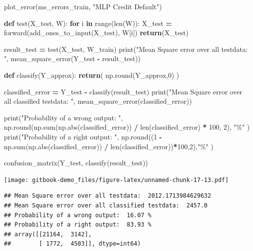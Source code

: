 \documentclass[
]{book}
\newenvironment{Shaded}{\begin{snugshade}}{\end{snugshade}}
\newcommand{\BuiltInTok}[1]{#1}
\newcommand{\ControlFlowTok}[1]{\textcolor[rgb]{0.13,0.29,0.53}{\textbf{#1}}}
\newcommand{\DecValTok}[1]{\textcolor[rgb]{0.00,0.00,0.81}{#1}}
\newcommand{\KeywordTok}[1]{\textcolor[rgb]{0.13,0.29,0.53}{\textbf{#1}}}
\newcommand{\NormalTok}[1]{#1}
\newcommand{\OperatorTok}[1]{\textcolor[rgb]{0.81,0.36,0.00}{\textbf{#1}}}
\newcommand{\StringTok}[1]{\textcolor[rgb]{0.31,0.60,0.02}{#1}}
\begin{document}
\begin{Shaded}
\begin{Highlighting}[]
\NormalTok{plot\_error(ms\_errors\_train, }\StringTok{"MLP Credit Default"}\NormalTok{)}



\KeywordTok{def}\NormalTok{ test(X\_test, W):}
  \ControlFlowTok{for}\NormalTok{ i }\KeywordTok{in} \BuiltInTok{range}\NormalTok{(}\BuiltInTok{len}\NormalTok{(W)):}
\NormalTok{    X\_test }\OperatorTok{=}\NormalTok{ forward(add\_ones\_to\_input(X\_test), W[i])}
  \ControlFlowTok{return}\NormalTok{(X\_test)}
  

\NormalTok{result\_test }\OperatorTok{=}\NormalTok{ test(X\_test, W\_train)}
\BuiltInTok{print}\NormalTok{(}\StringTok{"Mean Square error over all testdata: "}\NormalTok{, mean\_square\_error(Y\_test }\OperatorTok{{-}}\NormalTok{ result\_test))}


\KeywordTok{def}\NormalTok{ classify(Y\_approx):}
  \ControlFlowTok{return}\NormalTok{( np.}\BuiltInTok{round}\NormalTok{(Y\_approx,}\DecValTok{0}\NormalTok{) )}

\NormalTok{classified\_error }\OperatorTok{=}\NormalTok{ Y\_test }\OperatorTok{{-}}\NormalTok{ classify(result\_test)}
\BuiltInTok{print}\NormalTok{(}\StringTok{"Mean Square error over all classified testdata: "}\NormalTok{, mean\_square\_error(classified\_error))}

\BuiltInTok{print}\NormalTok{(}\StringTok{"Probability of a wrong output: "}\NormalTok{, np.}\BuiltInTok{round}\NormalTok{(np.}\BuiltInTok{sum}\NormalTok{(np.}\BuiltInTok{abs}\NormalTok{(classified\_error)) }\OperatorTok{/} \BuiltInTok{len}\NormalTok{(classified\_error) }\OperatorTok{*} \DecValTok{100}\NormalTok{, }\DecValTok{2}\NormalTok{), }\StringTok{"\%"}\NormalTok{ )}
\BuiltInTok{print}\NormalTok{(}\StringTok{"Probability of a right output: "}\NormalTok{, np.}\BuiltInTok{round}\NormalTok{((}\DecValTok{1} \OperatorTok{{-}}\NormalTok{ np.}\BuiltInTok{sum}\NormalTok{(np.}\BuiltInTok{abs}\NormalTok{(classified\_error)) }\OperatorTok{/} \BuiltInTok{len}\NormalTok{(classified\_error))}\OperatorTok{*}\DecValTok{100}\NormalTok{,}\DecValTok{2}\NormalTok{),}\StringTok{"\%"}\NormalTok{ )}


\NormalTok{confusion\_matrix(Y\_test, classify(result\_test))}
\end{Highlighting}
\end{Shaded}

\texttt{[image: gitbook-demo\_files/figure-latex/unnamed-chunk-17-13.pdf]}

\begin{verbatim}
## Mean Square error over all testdata:  2012.1713984629632
## Mean Square error over all classified testdata:  2457.0
## Probability of a wrong output:  16.07 %
## Probability of a right output:  83.93 %
## array([[21164,  3142],
##        [ 1772,  4503]], dtype=int64)
\end{verbatim}
\end{document}
